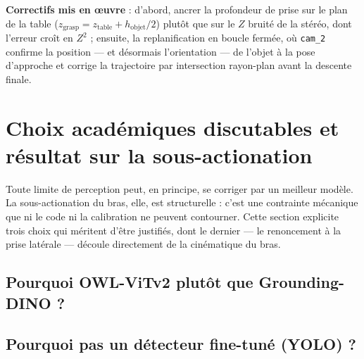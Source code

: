 \textbf{Correctifs mis en {\oe}uvre} : d'abord, ancrer la profondeur de prise sur
le plan de la table ($z_\text{grasp} = z_\text{table} + h_\text{objet}/2$) plutôt
que sur le $Z$ bruité de la stéréo, dont l'erreur croît en $Z^2$ ; ensuite, la
replanification en boucle fermée, où \texttt{cam\_2} confirme la position --- et
désormais l'orientation --- de l'objet à la pose d'approche et corrige la
trajectoire par intersection rayon-plan avant la descente finale.

\section{Choix académiques discutables et résultat sur la sous-actionation}
\label{sec:disc_choix}

Toute limite de perception peut, en principe, se corriger par un meilleur modèle.
La sous-actionation du bras, elle, est structurelle : c'est une contrainte
mécanique que ni le code ni la calibration ne peuvent contourner. Cette section
explicite trois choix qui méritent d'être justifiés, dont le dernier --- le
renoncement à la prise latérale --- découle directement de la cinématique du
bras.

\subsection{Pourquoi OWL-ViTv2 plutôt que Grounding-DINO ?}


\subsection{Pourquoi pas un détecteur fine-tuné (YOLO) ?}


